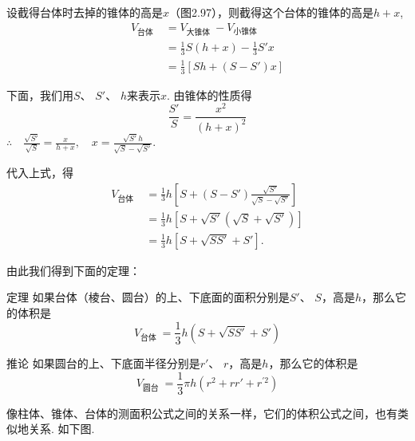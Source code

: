\begin{solution}
设截得台体时去掉的锥体的高是$x$（图2.97），则截得这个台体的锥体的高是$h+x$, 
\[\begin{split}
    V_{\text{台体 }}&=V_{\text{大锥体 }}-V_{\text{小锥体 }}\\
&=\frac{1}{3}S(h+x)-\frac{1}{3}S'x\\
&=\frac{1}{3}\left[Sh+\left(S-S'\right)x\right]
\end{split}\]

下面，我们用$S$、 $S'$、 $h$来表示$x$. 由锥体的性质得
\[\frac{S'}{S}=\frac{x^{2}}{(h+x)^{2}}\]
$\therefore\quad \frac{\sqrt{S'}}{\sqrt{S}}=\frac{x}{h+x},\quad x=\frac{\sqrt{S'}h}{\sqrt{S}-\sqrt{S'}}.$

代入上式，得
\[\begin{split}
V_{\text{台体 }}&=\frac{1}{3}h\left[S+\left(S-S'\right)\frac{\sqrt{S'}}{\sqrt{S}-\sqrt{S'}}\right]\\
& =\frac{1}{3}h\left[S+\sqrt{S'}(\sqrt{S}+\sqrt{S'})\right]\\
& =\frac{1}{3}h\left[S+\sqrt{SS'}+S'\right].    
\end{split}\]
\end{solution}

由此我们得到下面的定理：
\begin{thm}
{定理} 如果台体（棱台、圆台）的上、下底面的面积分别是$S'$、 $S$，高是$h$，那么它的体积是
\[V_{\text{台体 }}=\frac{1}{3}h\left(S+\sqrt{SS'}+S'\right)
\]
\end{thm}

\begin{thm}
 {推论} 如果圆台的上、下底面半径分别是$r'$、 $r$，高是$h$，那么它的体积是
\[ V_{\text{圆台 }}=\frac{1}{3}\pi h\left(r^{2}+rr'+r^{\prime 2}\right)
 \]
\end{thm}

像柱体、锥体、台体的测面积公式之间的关系一样，它们的体积公式之间，也有类似地关系. 如下图.
\begin{figure}[htp]
    \centering
{}
\end{figure}

